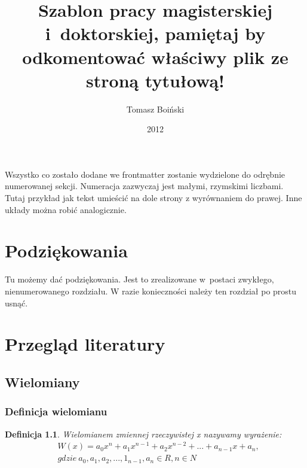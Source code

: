 \documentclass[twoside,a4paper]{book}
\title{Szablon pracy magisterskiej i~doktorskiej, pamiętaj by odkomentować właściwy plik ze stroną tytułową!}
\author{Tomasz Boiński}
\date{2012}
\newtheorem{definition}{Definicja}
\begin{document}
\frontmatter
\maketitle
\tableofcontents

\newpage
\null
\vfill
\begin{flushright}
  Wszystko co zostało dodane we frontmatter zostanie wydzielone do odrębnie numerowanej sekcji. Numeracja zazwyczaj jest małymi, rzymskimi liczbami. Tutaj przykład jak tekst umieścić na dole strony z wyrównaniem do prawej. Inne układy można robić analogicznie.
\end{flushright}

\chapter*{Podziękowania}
Tu możemy dać podziękowania. Jest to zrealizowane w~postaci zwykłego, nienumerowanego rozdziału. W razie konieczności należy ten rozdział po prostu usnąć.















\mainmatter

\chapter{Przegląd literatury}
\section{Wielomiany}
\subsection{Definicja wielomianu}




\begin{definition}
	Wielomianem zmiennej rzeczywistej x nazywamy wyrażenie:
	\begin{equation}
		\begin{split}
			&W(x) = a_0x^n + a_1x^{n-1} + a_2x^{n-2}+ ... + a_{n-1}x + a_n, \\
			&gdzie\ a_0, a_1, a_2, ..., 1_{n-1}, a_n\in R, n \in N 
		\end{split}
	\end{equation}
\end{definition}
\end{document}
